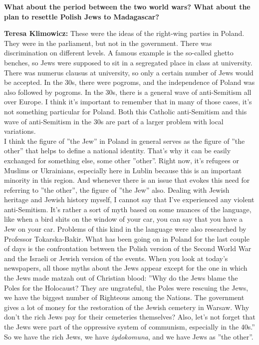 \textbf{What about the period between the two world wars? What about the plan to resettle Polish Jews to Madagascar?}

\textbf{Teresa Klimowicz:} These were the ideas of the right-wing parties in Poland. They were in the parliament, but not in the government. There was discrimination on different levels. A famous example is the so-called ghetto benches, so Jews were supposed to sit in a segregated place in class at university. There was numerus clausus at university, so only a certain number of Jews would be accepted. In the 30s, there were pogroms, and the independence of Poland was also followed by pogroms. In the 30s, there is a general wave of anti-Semitism all over Europe. I think it's important to remember that in many of those cases, it's not something particular for Poland. Both this Catholic anti-Semitism and this wave of anti-Semitism in the 30s are part of a larger problem with local variations. \\
I think the figure of ''the Jew'' in Poland in general serves as the figure of ''the other'' that helps to define a national identity. That's why it can be easily exchanged for something else, some other ''other''. Right now, it's refugees or Muslims or Ukrainians, especially here in Lublin because this is an important minority in this region. And whenever there is an issue that evokes this need for referring to ''the other'', the figure of ''the Jew'' also. Dealing with Jewish heritage and Jewish history myself, I cannot say that I've experienced any violent anti-Semitism. It’s rather a sort of myth based on some nuances of the language, like when a bird shits on the window of your car, you can say that you have a Jew on your car. Problems of this kind in the language were also researched by Professor Tokarska-Bakir. What has been going on in Poland for the last couple of days is the confrontation between the Polish version of the Second World War and the Israeli or Jewish version of the events. When you look at today's newspapers, all those myths about the Jews appear except for the one in which the Jews made matzah out of Christian blood: ''Why do the Jews blame the Poles for the Holocaust? They are ungrateful, the Poles were rescuing the Jews, we have the biggest number of Righteous among the Nations. The government gives a lot of money for the restoration of the Jewish cemetery in Warsaw. Why don't the rich Jews pay for their cemeteries themselves? Also, let’s not forget that the Jews were part of the oppressive system of communism, especially in the 40s.'' So we have the rich Jews, we have \textit{żydokomuna}, and we have Jews as ''the other''.  

